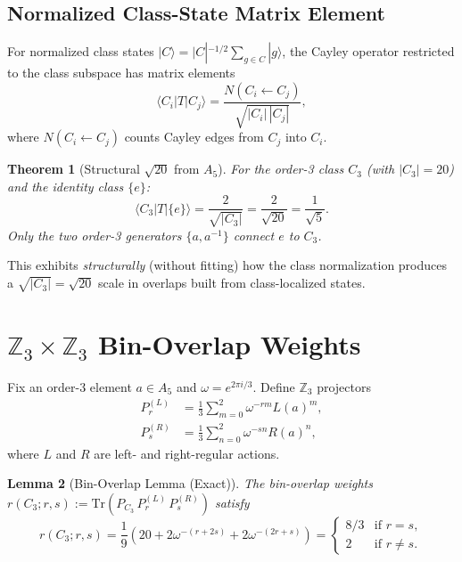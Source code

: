 \documentclass[11pt,a4paper]{article}
\newcommand{\Tr}{\mathrm{Tr}}
\newtheorem{theorem}{Theorem}
\newtheorem{lemma}[theorem]{Lemma}
\theoremstyle{definition}
\theoremstyle{remark}
\begin{document}
\subsection{Normalized Class-State Matrix Element}

For normalized class states $|C\rangle = |C|^{-1/2}\sum_{g\in C}|g\rangle$,
the Cayley operator restricted to the class subspace has matrix elements
\begin{equation}
\langle C_i | T | C_j \rangle = \frac{N(C_i \leftarrow C_j)}{\sqrt{|C_i|\,|C_j|}},
\end{equation}
where $N(C_i \leftarrow C_j)$ counts Cayley edges from $C_j$ into $C_i$.

\begin{theorem}[Structural $\sqrt{20}$ from $A_5$]
For the order-3 class $C_3$ (with $|C_3|=20$) and the identity class $\{e\}$:
\begin{equation}
\langle C_3 | T | \{e\}\rangle = \frac{2}{\sqrt{|C_3|}} = \frac{2}{\sqrt{20}} = \frac{1}{\sqrt{5}}.
\end{equation}
Only the two order-3 generators $\{a, a^{-1}\}$ connect $e$ to $C_3$.
\end{theorem}

This exhibits \emph{structurally} (without fitting) how the class normalization
produces a $\sqrt{|C_3|} = \sqrt{20}$ scale in overlaps built from
class-localized states.

\section{$\mathbb{Z}_3\times\mathbb{Z}_3$ Bin-Overlap Weights}
\label{sec:bin}

Fix an order-3 element $a \in A_5$ and $\omega = e^{2\pi i/3}$.  Define
$\mathbb{Z}_3$ projectors
\begin{align}
P_r^{(L)} &= \frac{1}{3}\sum_{m=0}^{2}\omega^{-rm}L(a)^m, \\
P_s^{(R)} &= \frac{1}{3}\sum_{n=0}^{2}\omega^{-sn}R(a)^n,
\end{align}
where $L$ and $R$ are left- and right-regular actions.

\begin{lemma}[Bin-Overlap Lemma (Exact)]
\label{lem:bin}
The bin-overlap weights $r(C_3; r, s) := \Tr(P_{C_3}\,P_r^{(L)}\,P_s^{(R)})$ satisfy
\begin{equation}
\boxed{r(C_3; r, s) = \frac{1}{9}\left(20 + 2\omega^{-(r+2s)} + 2\omega^{-(2r+s)}\right)
= \begin{cases} 8/3 & \text{if } r = s, \\ 2 & \text{if } r \neq s. \end{cases}}
\end{equation}
\end{lemma}
\end{document}
